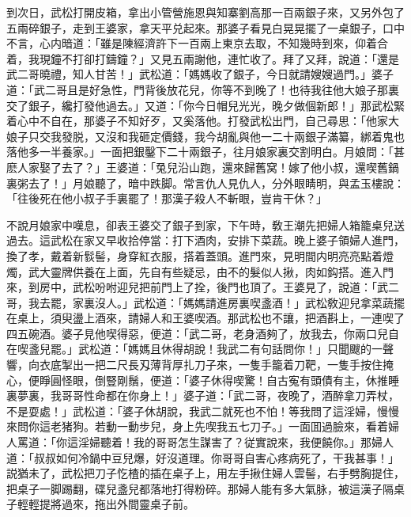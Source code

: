 到次日，武松打開皮箱，拿出小管營施恩與知寨劉高那一百兩銀子來，又另外包了五兩碎銀子，走到王婆家，拿天平兑起來。那婆子看見白晃晃擺了一桌銀子，口中不言，心内暗道：「雖是陳經濟許下一百兩上東京去取，不知幾時到來，仰着合着，我現鐘不打卻打鑄鐘？」又見五兩謝他，連忙收了。拜了又拜，說道：「還是武二哥曉禮，知人甘苦！」武松道：「媽媽收了銀子，今日就請嫂嫂過門。」婆子道：「武二哥且是好急性，門背後放花兒，你等不到晚了！也待我往他大娘子那裏交了銀子，纔打發他過去。」又道：「你今日帽兒光光，晚夕做個新郎！」那武松緊着心中不自在，那婆子不知好歹，又奚落他。打發武松出門，自己尋思：「他家大娘子只交我發脱，又沒和我砸定價錢，我今胡亂與他一二十兩銀子滿纂，綁着鬼也落他多一半養家。」一面把銀鑿下二十兩銀子，往月娘家裏交割明白。月娘問：「甚麽人家娶了去了？」王婆道：「兔兒沿山跑，還來歸舊窝！嫁了他小叔，還喫舊鍋裏粥去了！」月娘聽了，暗中跌脚。常言仇人見仇人，分外眼睛明，與孟玉樓說：「往後死在他小叔子手裏罷了！那漢子殺人不斬眼，豈肯干休？」

不說月娘家中嘆息，卻表王婆交了銀子到家，下午時，敎王潮先把婦人箱籠桌兒送過去。這武松在家又早收拾停當：打下酒肉，安排下菜蔬。晚上婆子領婦人進門，換了孝，戴着新䯼髻，身穿紅衣服，搭着蓋頭。進門來，見明間内明亮亮點着燈燭，武大靈牌供養在上面，先自有些疑忌，由不的髮似人揪，肉如鈎搭。進入門來，到房中，武松吩咐迎兒把前門上了拴，後門也頂了。王婆見了，說道：「武二哥，我去罷，家裏沒人。」武松道：「媽媽請進房裏喫盞酒！」武松敎迎兒拿菜蔬擺在桌上，須臾盪上酒來，請婦人和王婆喫酒。那武松也不讓，把酒斟上，一連喫了四五碗酒。婆子見他喫得惡，便道：「武二哥，老身酒夠了，放我去，你兩口兒自在喫盞兒罷。」武松道：「媽媽且休得胡說！我武二有句話問你！」只聞颼的一聲響，向衣底掣出一把二尺長刄薄背厚扎刀子來，一隻手籠着刀靶，一隻手按住掩心，便睜圓怪眼，倒豎剛鬚，便道：「婆子休得喫驚！自古寃有頭債有主，休推睡裏夢裏，我哥哥性命都在你身上！」婆子道：「武二哥，夜晚了，酒醉拿刀弄杖，不是耍處！」武松道：「婆子休胡說，我武二就死也不怕！等我問了這淫婦，慢慢來問你這老猪狗。若動一動步兒，身上先喫我五七刀子。」一面囬過臉來，看着婦人罵道：「你這淫婦聽着！我的哥哥怎生謀害了？従實說來，我便饒你。」那婦人道：「叔叔如何冷鍋中豆兒爆，好沒道理。你哥哥自害心疼病死了，干我甚事！」説猶未了，武松把刀子忔楂的插在桌子上，用左手揪住婦人雲髻，右手劈胸提住，把桌子一脚踢翻，碟兒盞兒都落地打得粉碎。那婦人能有多大氣脉，被這漢子隔桌子輕輕提將過來，拖出外間靈桌子前。

